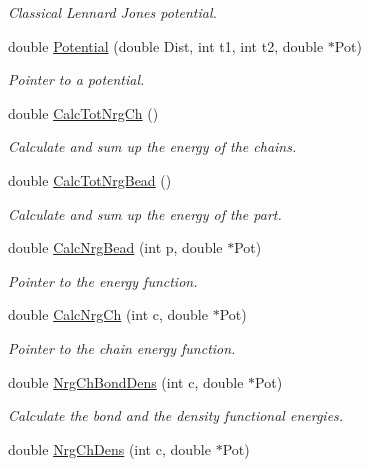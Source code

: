 \begin{DoxyCompactItemize}
\begin{DoxyCompactList}\small\item\em Classical Lennard Jones potential. \end{DoxyCompactList}\item 
double \hyperlink{classForces_ac5ef477f97601b779392b8622ac6b1fe}{Potential} (double Dist, int t1, int t2, double $\ast$Pot)\hypertarget{classForces_ac5ef477f97601b779392b8622ac6b1fe}{}\label{classForces_ac5ef477f97601b779392b8622ac6b1fe}

\begin{DoxyCompactList}\small\item\em Pointer to a potential. \end{DoxyCompactList}\item 
double \hyperlink{classForces_a59c5e973ca9b852115683c3cc2fc6035}{Calc\+Tot\+Nrg\+Ch} ()
\begin{DoxyCompactList}\small\item\em Calculate and sum up the energy of the chains. \end{DoxyCompactList}\item 
double \hyperlink{classForces_a279acbc4a6538860aad95a08f3edc78f}{Calc\+Tot\+Nrg\+Bead} ()
\begin{DoxyCompactList}\small\item\em Calculate and sum up the energy of the part. \end{DoxyCompactList}\item 
double \hyperlink{classForces_a3fa7f92932bea2b6abd0231b7610b6d2}{Calc\+Nrg\+Bead} (int p, double $\ast$Pot)\hypertarget{classForces_a3fa7f92932bea2b6abd0231b7610b6d2}{}\label{classForces_a3fa7f92932bea2b6abd0231b7610b6d2}

\begin{DoxyCompactList}\small\item\em Pointer to the energy function. \end{DoxyCompactList}\item 
double \hyperlink{classForces_ac028948e0862f18bf805f23078ebf7fa}{Calc\+Nrg\+Ch} (int c, double $\ast$Pot)\hypertarget{classForces_ac028948e0862f18bf805f23078ebf7fa}{}\label{classForces_ac028948e0862f18bf805f23078ebf7fa}

\begin{DoxyCompactList}\small\item\em Pointer to the chain energy function. \end{DoxyCompactList}\item 
double \hyperlink{classForces_ab282af6b6987c94833eb3eb9bc5d28a4}{Nrg\+Ch\+Bond\+Dens} (int c, double $\ast$Pot)
\begin{DoxyCompactList}\small\item\em Calculate the bond and the density functional energies. \end{DoxyCompactList}\item 
double \hyperlink{classForces_ab40568d4784987cff90e5081eee86a93}{Nrg\+Ch\+Dens} (int c, double $\ast$Pot)\hypertarget{classForces_ab40568d4784987cff90e5081eee86a93}{}\label{classForces_ab40568d4784987cff90e5081eee86a93}


\end{DoxyCompactItemize}
